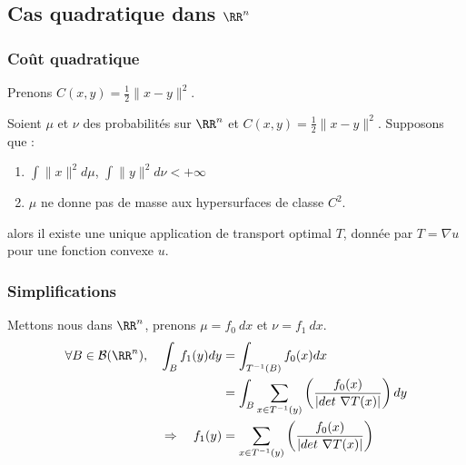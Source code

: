 \documentclass{beamer}
\begin{document}
  \subsection{Cas quadratique dans $\RR^n$}
  
  \begin{frame}\frametitle{Coût quadratique}
  	Prenons $C(x,y)=\frac{1}{2}\|x-y\|^2$. \\
  	\begin{theoreme}{}
Soient $\mu$ et $\nu$ des probabilités sur $\RR^n$ et $C(x,y)=\frac{1}{2}\|x-y\|^2$. Supposons que : 
\begin{enumerate}
\item $\int\|x\|^2d\mu$, $\int\|y\|^2d\nu<+\infty$
\item $\mu$ ne donne pas de masse aux hypersurfaces de classe $C^2$.
\end{enumerate}
alors il existe une unique application de transport optimal $T$, donnée par $T=\nabla u$ pour une fonction convexe $u$.
\end{theoreme}
  \end{frame}

  
  \begin{frame}\frametitle{Simplifications}
  Mettons nous dans $\RR^n$, prenons $\mu = f_0\ dx$ et $\nu = f_1\ dx$.
 { 
	\begin{align*}
	\forall B \in\mathcal{B}(\RR^n),\quad \int_B f_1(y)dy&=\int_{T^{-1}(B)} f_0(x) dx \\
	&= \int_B \sum_{x\in T^{-1}(y)} \left(\frac{f_0(x)}{|det\ \nabla T(x)|}\right)dy\\
	\Rightarrow\quad f_1(y) &= \sum_{x\in T^{-1}(y)} \left(\frac{f_0(x)}{|det\ \nabla T(x)|}\right)
	\end{align*}
}
  \end{frame}
\end{document}
